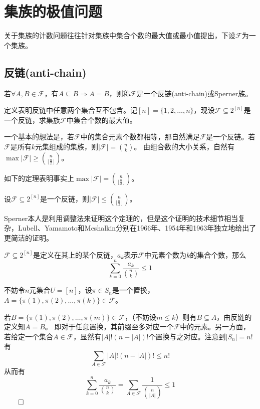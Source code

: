 ﻿\documentclass[11pt]{article}
\newtheorem{theorem}{{\hskip 1.7em \bf 定理}}
\newtheorem{definition}[theorem]{\hskip 1.7em 定义}
\renewenvironment{proof}{{\noindent\hskip 2em \bf 证明 \quad}}{\hfill$\qed$\par}
\begin{document}
    \section{集族的极值问题}

    关于集族的计数问题往往针对集族中集合个数的最大值或最小值提出，下设$\mathcal{F}$为一个集族。

    \subsection{反链(anti-chain)}

    \begin{definition}[反链]
        若$\forall A, B\in \mathcal{F}$，有$A\subseteq B\Rightarrow A=B$，则称$\mathcal{F}$是一个反链(anti-chain)或Sperner族。
    \end{definition}

    定义表明反链中任意两个集合互不包含。记$[n]=\{1, 2,\dots, n\}$，现设$\mathcal{F}\subseteq 2^{[n]}$是一个反链，求集族$\mathcal{F}$中集合个数的最大值。

    一个基本的想法是，若$\mathcal{F}$中的集合元素个数都相等，那自然满足$\mathcal{F}$是一个反链。若$\mathcal{F}$是所有$k$元集组成的集族，则$|\mathcal{F}|={n\choose k}$。 由组合数的大小关系，自然有$\max |\mathcal{F}|\ge {n\choose {\lfloor\frac{n}{2}\rfloor}}$。

    如下的定理表明事实上$\max |\mathcal{F}|= {n\choose {\lfloor\frac{n}{2}\rfloor}}$。
    \begin{theorem}[Sperner定理]
        设$\mathcal{F}\subseteq 2^{[n]}$是一个反链，则$|\mathcal{F}|\le {n\choose {\lfloor\frac{n}{2}\rfloor}}$。
    \end{theorem}

    Sperner本人是利用调整法来证明这个定理的，但是这个证明的技术细节相当复杂，Lubell、Yamamoto和Meshalkin分别在1966年、1954年和1963年独立地给出了更简洁的证明。

    \begin{theorem}
        $\mathcal{F}\subseteq 2^{[n]}$是定义在其上的某个反链，$a_k$表示$\mathcal{F}$中元素个数为$k$的集合个数，那么
        \[
            \sum_{k=0}^n\frac{a_k}{\binom{n}{k}}\leq 1
        \]
    \end{theorem}
    \begin{proof}
        不妨令$n$元集合$U=[n]$，设$\pi \in S_n$是一个置换，$A=\{\pi(1), \pi(2),\dots , \pi(k)\}\in \mathcal{F}$。

        若$B=\{\pi(1), \pi(2),\dots , \pi(m)\} \in \mathcal{F}$，（不妨设$m\leq k$）则有$B\subseteq A$，由反链的定义知$A=B$。 即对于任意置换，其前缀至多对应一个$\mathcal{F}$中的元素。另一方面，若给定一个集合$A\in \mathcal{F}$，显然有$|A|!(n-|A|)!$个置换与之对应。注意到$|S_n|=n!$有
        \[
            \sum_{A\in \mathcal{F}}|A|!(n-|A|)!\le n!
        \]
        从而有
        \[
            \sum_{k=0}^n\frac{a_k}{\binom{n}{k}} = \sum_{A\in \mathcal{F}}\frac{1}{{n\choose |A|}} \leq 1
        \]
        \qedhere
    \end{proof}
\end{document}
